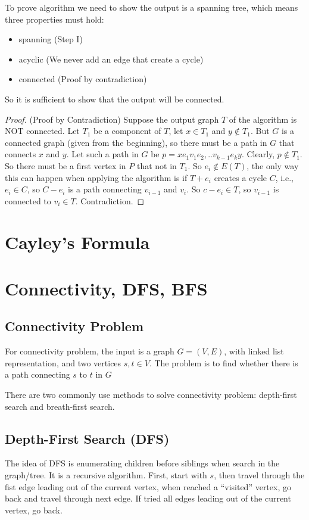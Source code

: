 			To prove algorithm we need to show the output is a spanning tree, which means three properties must hold:
			\begin{itemize}
				\item spanning (Step I)
				\item acyclic (We never add an edge that create a cycle)
				\item connected (Proof by contradiction)
			\end{itemize}
			So it is sufficient to show that the output will be connected.
			\begin{proof}
				(Proof by Contradiction) Suppose the output graph $T$ of the algorithm is NOT connected. Let $T_1$ be a component of $T$, let $x\in T_1$ and $y \notin T_1$. But $G$ is a connected graph (given from the beginning), so there must be a path in $G$ that connects $x$ and $y$. Let such a path in $G$ be $p=xe_1v_1e_2,..v_{k-1}e_ky$. Clearly, $p\notin T_1$. So there must be a first vertex in $P$ that not in $T_1$. So $e_i \notin E(T)$, the only way this can happen when applying the algorithm is if $T + e_i$ creates a cycle $C$, i.e., $e_i \in C$, so $C - e_i$ is a path connecting $v_{i-1}$ and $v_i$. So $c - e_i \in T$, so $v_{i-1}$ is connected to $v_i \in T$. Contradiction. 
			\end{proof}

		\section{Cayley's Formula}

		\section{Connectivity, DFS, BFS}
			\subsection{Connectivity Problem}
				For connectivity problem, the input is a graph $G = (V, E)$, with linked list representation, and two vertices $s, t\in V$. The problem is to find whether there is a path connecting $s$ to $t$ in $G$

				There are two commonly use methods to solve connectivity problem: depth-first search and breath-first search.
			\subsection{Depth-First Search (DFS)}
				The idea of DFS is enumerating children before siblings when search in the graph/tree. It is a recursive algorithm. First, start with $s$, then travel through the fist edge leading out of the current vertex, when reached a ``visited'' vertex, go back and travel through next edge. If tried all edges leading out of the current vertex, go back.

